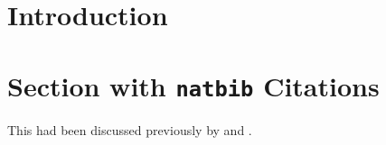 


\lipsum[5]

\section{Introduction}
\lipsum[6-8]


\section{Section with \texttt{natbib} Citations}

This had been discussed previously by \citep{bullwinkle:1990} and
\citet{bullwinkle:1991}. \lipsum[10-11]

\endinput
